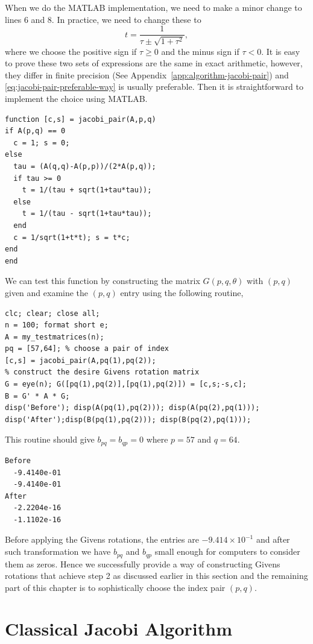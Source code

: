When we do the MATLAB implementation, we need to make a minor change to lines 6 and 8. In practice, we need to change these to 
\begin{equation}
  \label{eq:jacobi-pair-preferable-way}
  t = \frac{1}{\tau  \pm  \sqrt{1 + \tau^2}},
\end{equation}
where we choose the positive sign if $\tau \geq 0$ and the minus sign if $\tau <0$. It is easy to prove these two sets of expressions are the same in exact arithmetic, however, they differ in finite precision (See Appendix~\ref{app:algorithm-jacobi-pair}) and \eqref{eq:jacobi-pair-preferable-way} is usually preferable. Then it is straightforward to implement the choice using MATLAB.

\begin{lstlisting}
function [c,s] = jacobi_pair(A,p,q)
if A(p,q) == 0
  c = 1; s = 0;
else
  tau = (A(q,q)-A(p,p))/(2*A(p,q));
  if tau >= 0
    t = 1/(tau + sqrt(1+tau*tau));
  else
    t = 1/(tau - sqrt(1+tau*tau));
  end
  c = 1/sqrt(1+t*t); s = t*c;
end
end
\end{lstlisting}

We can test this function by constructing the matrix $G(p,q,\theta)$ with $(p,q)$ given and examine the $(p,q)$ entry using the following routine,

\begin{lstlisting}
clc; clear; close all;
n = 100; format short e;
A = my_testmatrices(n);
pq = [57,64]; % choose a pair of index
[c,s] = jacobi_pair(A,pq(1),pq(2)); 
% construct the desire Givens rotation matrix
G = eye(n); G([pq(1),pq(2)],[pq(1),pq(2)]) = [c,s;-s,c];
B = G' * A * G;
disp('Before'); disp(A(pq(1),pq(2))); disp(A(pq(2),pq(1)));
disp('After');disp(B(pq(1),pq(2))); disp(B(pq(2),pq(1)));
\end{lstlisting}
This routine should give $b_{pq} = b_{qp} = 0$ where $p = 57$ and $q = 64$.
\begin{lstlisting}
Before
  -9.4140e-01
  -9.4140e-01
After
  -2.2204e-16
  -1.1102e-16
\end{lstlisting}
Before applying the Givens rotations, the entries are $-9.414\times 10^{-1}$ and after such transformation we have $b_{pq}$ and $b_{qp}$ small enough for computers to consider them as zeros. Hence we successfully provide a way of constructing Givens rotations that achieve step 2 as discussed earlier in this section and the remaining part of this chapter is to sophistically choose the index pair $(p,q)$. 

\section{Classical Jacobi Algorithm}\label{sec:classical-jacobi}

